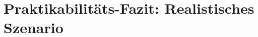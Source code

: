 \section{Praktikabilitäts-Fazit: Realistisches Szenario}
\label{sec:praktik_fazit}


\label{subsec:machbarkeit_setting}

\label{subsubsec:elite_training}

\label{subsubsec:mainstream_bildung}

\label{subsubsec:homeuse_self}
